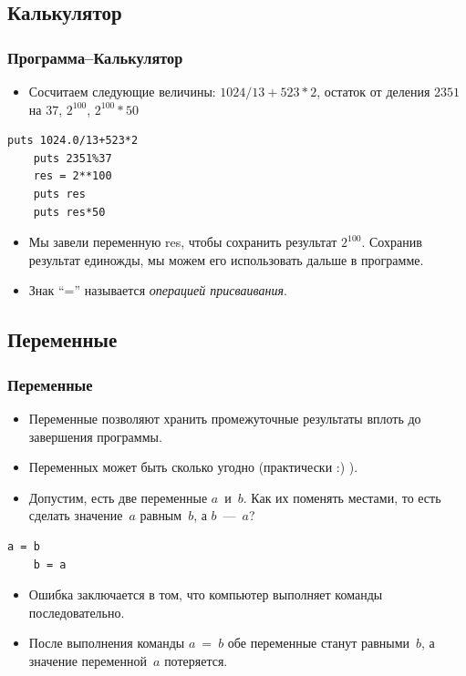 \documentclass[compress,red]{beamer}
\begin{document}
\subsection{Калькулятор}
\begin{frame}[fragile]
  \frametitle{Программа--Калькулятор}
  \begin{itemize}
    \item Сосчитаем следующие величины: $1024/13+523*2$, остаток от деления $2351$ на $37$, $2^{100}$, $2^{100}*50$
  \end{itemize}
  \begin{lstlisting}[label=ruby2,caption=Калькулятор]
    puts 1024.0/13+523*2
    puts 2351%37
    res = 2**100
    puts res
    puts res*50
  \end{lstlisting}
  \begin{itemize}
    \item Мы завели переменную res, чтобы сохранить результат $2^{100}$. Сохранив результат единожды, мы можем его использовать дальше в программе.
    \item Знак ``='' называется \emph{операцией присваивания}.
  \end{itemize}
\end{frame}

\subsection{Переменные}
\begin{frame}[fragile]
  \frametitle{Переменные}
  \begin{itemize}
    \item Переменные позволяют хранить промежуточные результаты вплоть до завершения программы.
    \item Переменных может быть сколько угодно (практически :) ).
    \item Допустим, есть две переменные $a$~и~$b$. Как их поменять местами, то есть сделать значение~$a$ равным~$b$, а $b$~---~$a$?
  \end{itemize}
  \begin{lstlisting}[label=ruby3,caption=Неправильный вариант]
    a = b
    b = a
  \end{lstlisting}
  \begin{itemize}
    \item Ошибка заключается в том, что компьютер выполняет команды последовательно.
    \item После выполнения команды $a~=~b$ обе переменные станут равными~$b$, а значение переменной~$a$ потеряется.
  \end{itemize}
\end{frame}
\end{document}
